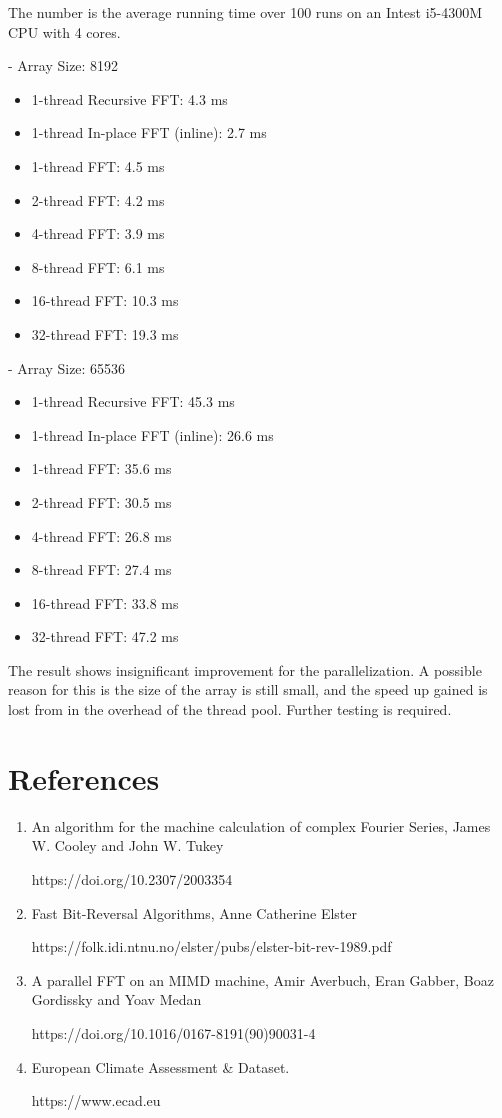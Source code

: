 \documentclass[10pt, letterpaper]{article}
\begin{document}
The number is the average running time over 100 runs on an Intest i5-4300M
CPU with 4 cores.

- Array Size: 8192
\begin{itemize}
	\item 1-thread Recursive FFT: 4.3 ms
	\item 1-thread In-place FFT (inline): 2.7 ms
	\item 1-thread FFT: 4.5 ms
	\item 2-thread FFT: 4.2 ms
	\item 4-thread FFT: 3.9 ms
	\item 8-thread FFT: 6.1 ms
	\item 16-thread FFT: 10.3 ms
	\item 32-thread FFT: 19.3 ms
\end{itemize}

- Array Size: 65536
\begin{itemize}
	\item 1-thread Recursive FFT: 45.3 ms
	\item 1-thread In-place FFT (inline): 26.6 ms
	\item 1-thread FFT: 35.6 ms
	\item 2-thread FFT: 30.5 ms
	\item 4-thread FFT: 26.8 ms
	\item 8-thread FFT: 27.4 ms
	\item 16-thread FFT: 33.8 ms
	\item 32-thread FFT: 47.2 ms
\end{itemize}

The result shows insignificant improvement for the parallelization. A
possible reason for this is the size of the array is still small, and the
speed up gained is lost from in the overhead of the thread pool. Further
testing is required.


\section{References}
\begin{enumerate}
	\item An algorithm for the machine calculation of complex Fourier
		Series, James W. Cooley and John W. Tukey

		https://doi.org/10.2307/2003354

	\item Fast Bit-Reversal Algorithms, Anne Catherine Elster

		https://folk.idi.ntnu.no/elster/pubs/elster-bit-rev-1989.pdf

	\item A parallel FFT on an MIMD machine, Amir Averbuch, Eran
		Gabber, Boaz Gordissky and Yoav Medan

		https://doi.org/10.1016/0167-8191(90)90031-4

	\item European Climate Assessment \& Dataset.

		https://www.ecad.eu
\end{enumerate}
\end{document}
